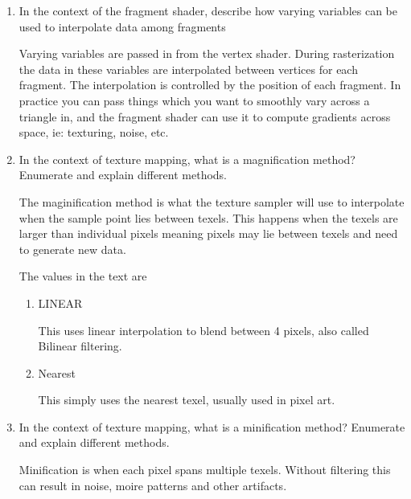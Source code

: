 \documentclass{article}
\begin{document}
\begin{enumerate}
        \item In the context of the fragment shader, describe how varying variables can be used to interpolate
            data among fragments

            \begin{mdframed}
                Varying variables are passed in from the vertex shader. During rasterization the data in these variables
                are interpolated between vertices for each fragment. The interpolation is controlled by the position of
                each fragment. In practice you can pass things which you want to smoothly vary across a triangle in,
                and the fragment shader can use it to compute gradients across space, ie: texturing, noise, etc.
            \end{mdframed}

        \item In the context of texture mapping, what is a magnification method? Enumerate and explain
            different methods.

            \begin{mdframed}
                The maginification method is what the texture sampler will use to interpolate when the sample point
                lies between texels. This happens when the texels are larger than individual pixels meaning pixels may lie
                between texels and need to generate new data.

                The values in the text are
                \begin{enumerate}
                    \item LINEAR
                        
                        This uses linear interpolation to blend between 4 pixels, also called
                        Bilinear filtering.

                    \item Nearest

                        This simply uses the nearest texel, usually used in pixel art.
                \end{enumerate}
            \end{mdframed}
        \item In the context of texture mapping, what is a minification method? Enumerate and explain
            different methods.

            \begin{mdframed}
                Minification is when each pixel spans multiple texels. Without filtering this can result in noise,
                moire patterns and other artifacts.


\end{mdframed}
\end{enumerate}
\end{document}
